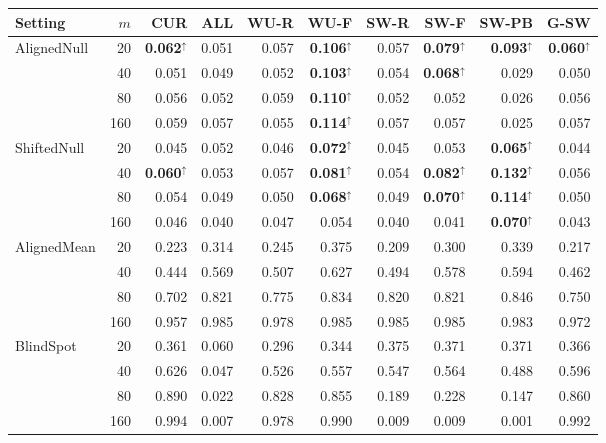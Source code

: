 \begin{tabular}{@{}lrrrrrrrrr@{}}
\toprule
Setting & $m$ & CUR & ALL & WU-R & WU-F & SW-R & SW-F & SW-PB & G-SW\\
\midrule
AlignedNull & 20 & \textbf{0.062}$^{\uparrow}$ & 0.051 & 0.057 & \textbf{0.106}$^{\uparrow}$ & 0.057 & \textbf{0.079}$^{\uparrow}$ & \textbf{0.093}$^{\uparrow}$ & \textbf{0.060}$^{\uparrow}$\\
 & 40 & 0.051 & 0.049 & 0.052 & \textbf{0.103}$^{\uparrow}$ & 0.054 & \textbf{0.068}$^{\uparrow}$ & 0.029 & 0.050\\
 & 80 & 0.056 & 0.052 & 0.059 & \textbf{0.110}$^{\uparrow}$ & 0.052 & 0.052 & 0.026 & 0.056\\
 & 160 & 0.059 & 0.057 & 0.055 & \textbf{0.114}$^{\uparrow}$ & 0.057 & 0.057 & 0.025 & 0.057\\
\addlinespace[2pt]
ShiftedNull & 20 & 0.045 & 0.052 & 0.046 & \textbf{0.072}$^{\uparrow}$ & 0.045 & 0.053 & \textbf{0.065}$^{\uparrow}$ & 0.044\\
 & 40 & \textbf{0.060}$^{\uparrow}$ & 0.053 & 0.057 & \textbf{0.081}$^{\uparrow}$ & 0.054 & \textbf{0.082}$^{\uparrow}$ & \textbf{0.132}$^{\uparrow}$ & 0.056\\
 & 80 & 0.054 & 0.049 & 0.050 & \textbf{0.068}$^{\uparrow}$ & 0.049 & \textbf{0.070}$^{\uparrow}$ & \textbf{0.114}$^{\uparrow}$ & 0.050\\
 & 160 & 0.046 & 0.040 & 0.047 & 0.054 & 0.040 & 0.041 & \textbf{0.070}$^{\uparrow}$ & 0.043\\
\addlinespace[2pt]
AlignedMean & 20 & 0.223 & 0.314 & 0.245 & 0.375 & 0.209 & 0.300 & 0.339 & 0.217\\
 & 40 & 0.444 & 0.569 & 0.507 & 0.627 & 0.494 & 0.578 & 0.594 & 0.462\\
 & 80 & 0.702 & 0.821 & 0.775 & 0.834 & 0.820 & 0.821 & 0.846 & 0.750\\
 & 160 & 0.957 & 0.985 & 0.978 & 0.985 & 0.985 & 0.985 & 0.983 & 0.972\\
\addlinespace[2pt]
BlindSpot & 20 & 0.361 & 0.060 & 0.296 & 0.344 & 0.375 & 0.371 & 0.371 & 0.366\\
 & 40 & 0.626 & 0.047 & 0.526 & 0.557 & 0.547 & 0.564 & 0.488 & 0.596\\
 & 80 & 0.890 & 0.022 & 0.828 & 0.855 & 0.189 & 0.228 & 0.147 & 0.860\\
 & 160 & 0.994 & 0.007 & 0.978 & 0.990 & 0.009 & 0.009 & 0.001 & 0.992\\
\bottomrule
\end{tabular}